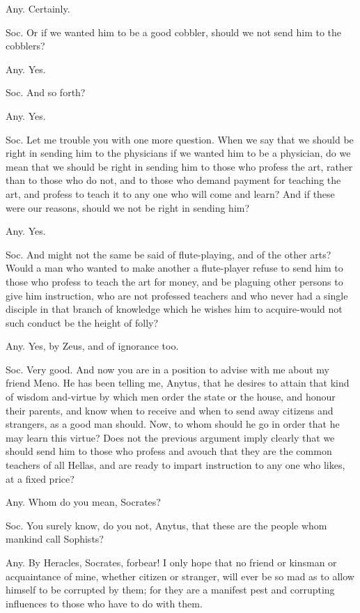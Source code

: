 Any. Certainly. 

Soc. Or if we wanted him to be a good cobbler, should we not send
him to the cobblers? 

Any. Yes. 

Soc. And so forth? 

Any. Yes. 

Soc. Let me trouble you with one more question. When we say that we
should be right in sending him to the physicians if we wanted him
to be a physician, do we mean that we should be right in sending him
to those who profess the art, rather than to those who do not, and
to those who demand payment for teaching the art, and profess to teach
it to any one who will come and learn? And if these were our reasons,
should we not be right in sending him? 

Any. Yes. 

Soc. And might not the same be said of flute-playing, and of the other
arts? Would a man who wanted to make another a flute-player refuse
to send him to those who profess to teach the art for money, and be
plaguing other persons to give him instruction, who are not professed
teachers and who never had a single disciple in that branch of knowledge
which he wishes him to acquire-would not such conduct be the height
of folly? 

Any. Yes, by Zeus, and of ignorance too. 

Soc. Very good. And now you are in a position to advise with me about
my friend Meno. He has been telling me, Anytus, that he desires to
attain that kind of wisdom and-virtue by which men order the state
or the house, and honour their parents, and know when to receive and
when to send away citizens and strangers, as a good man should. Now,
to whom should he go in order that he may learn this virtue? Does
not the previous argument imply clearly that we should send him to
those who profess and avouch that they are the common teachers of
all Hellas, and are ready to impart instruction to any one who likes,
at a fixed price? 

Any. Whom do you mean, Socrates? 

Soc. You surely know, do you not, Anytus, that these are the people
whom mankind call Sophists? 

Any. By Heracles, Socrates, forbear! I only hope that no friend or
kinsman or acquaintance of mine, whether citizen or stranger, will
ever be so mad as to allow himself to be corrupted by them; for they
are a manifest pest and corrupting influences to those who have to
do with them. 

